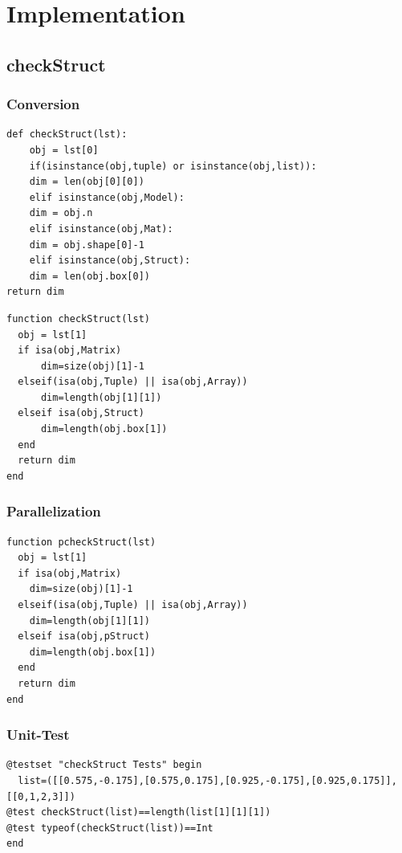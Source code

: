 \documentclass[a4paper,12pt]{article}
\begin{document}
\section{Implementation}
\subsection{checkStruct}
\subsubsection{Conversion}

\begin{Verbatim}[fontsize=\footnotesize]
def checkStruct(lst):
    obj = lst[0]
    if(isinstance(obj,tuple) or isinstance(obj,list)):
	dim = len(obj[0][0])
    elif isinstance(obj,Model):
	dim = obj.n
    elif isinstance(obj,Mat):
	dim = obj.shape[0]-1
    elif isinstance(obj,Struct):
	dim = len(obj.box[0])    
return dim
\end{Verbatim}

\begin{Verbatim}[fontsize=\footnotesize]
function checkStruct(lst)
  obj = lst[1]
  if isa(obj,Matrix)
      dim=size(obj)[1]-1
  elseif(isa(obj,Tuple) || isa(obj,Array))
      dim=length(obj[1][1])
  elseif isa(obj,Struct)
      dim=length(obj.box[1])
  end 
  return dim
end
\end{Verbatim}

\subsubsection{Parallelization}
\begin{Verbatim}[fontsize=\footnotesize]
function pcheckStruct(lst)
  obj = lst[1]
  if isa(obj,Matrix)
    dim=size(obj)[1]-1 
  elseif(isa(obj,Tuple) || isa(obj,Array))
    dim=length(obj[1][1])
  elseif isa(obj,pStruct)
    dim=length(obj.box[1])
  end
  return dim
end
\end{Verbatim}

\subsubsection{Unit-Test}
\begin{Verbatim}[fontsize=\footnotesize]
@testset "checkStruct Tests" begin
  list=([[0.575,-0.175],[0.575,0.175],[0.925,-0.175],[0.925,0.175]],[[0,1,2,3]])
@test checkStruct(list)==length(list[1][1][1])
@test typeof(checkStruct(list))==Int
end
\end{Verbatim}
\end{document}
